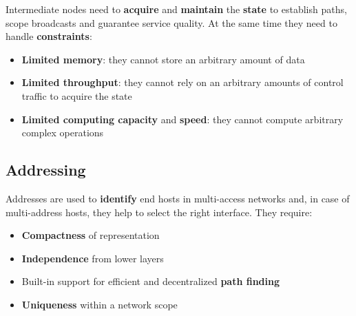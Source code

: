 \noindent Intermediate nodes need to \textbf{acquire} and \textbf{maintain} the \textbf{state} to establish paths, scope broadcasts and guarantee service quality. At the same time they need to handle \textbf{constraints}:
\begin{itemize}
	\item \textbf{Limited memory}: they cannot store an arbitrary amount of data
	\item \textbf{Limited throughput}: they cannot rely on an arbitrary amounts of control traffic to acquire the state
	\item \textbf{Limited computing capacity} and \textbf{speed}: they cannot compute arbitrary complex operations
\end{itemize}

\newpage
\subsection{Addressing}
Addresses are used to \textbf{identify} end hosts in multi-access networks and, in case of multi-address hosts, they help to select the right interface. They require:
\begin{itemize}
	\item \textbf{Compactness} of representation
	\item \textbf{Independence} from lower layers
	\item Built-in support for efficient and decentralized \textbf{path finding}
	\item \textbf{Uniqueness} within a network scope
\end{itemize}

